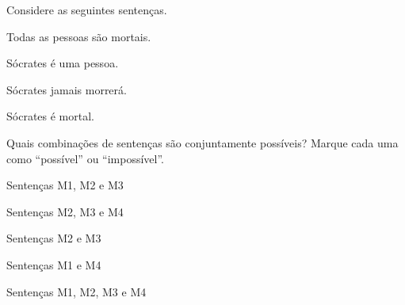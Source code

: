 \problempart Considere as seguintes sentenças.
\begin{compactlist}%
\item[M1.] \label{itm:allmortal} Todas as pessoas são mortais.
\item[M2.] \label{itm:socperson} Sócrates é uma pessoa.
\item[M3.] \label{itm:socnotdie} Sócrates jamais morrerá.
\item[M4.] \label{itm:socmortal} Sócrates é mortal.
\end{compactlist}
Quais combinações de sentenças são conjuntamente possíveis? Marque cada uma como \textquotedblleft possível\textquotedblright{} ou \textquotedblleft impossível\textquotedblright{}.
\begin{compactlist}
\item Sentenças M1, M2 e M3
\item Sentenças M2, M3 e M4
\item Sentenças M2 e M3
\item Sentenças M1 e M4
\item Sentenças M1, M2, M3 e M4
\end{compactlist}

